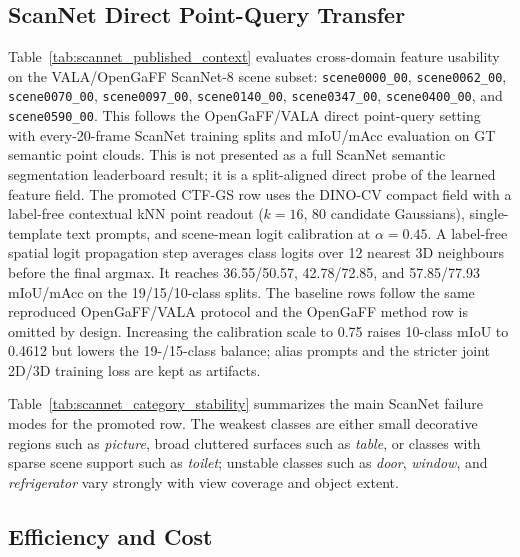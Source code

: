 \documentclass[10pt,twocolumn,letterpaper]{article}
\newcommand{\method}{CTF-GS}
\begin{document}
\subsection{ScanNet Direct Point-Query Transfer}



Table~\ref{tab:scannet_published_context} evaluates cross-domain feature
usability on the VALA/OpenGaFF ScanNet-8 scene subset:
\texttt{scene0000\_00}, \texttt{scene0062\_00}, \texttt{scene0070\_00},
\texttt{scene0097\_00}, \texttt{scene0140\_00}, \texttt{scene0347\_00},
\texttt{scene0400\_00}, and \texttt{scene0590\_00}. This follows the
OpenGaFF/VALA direct point-query setting with every-20-frame ScanNet training
splits and mIoU/mAcc evaluation on GT semantic point clouds. This is not
presented as a full ScanNet semantic segmentation leaderboard result; it is a
split-aligned direct probe of the learned feature field. The promoted
\method{} row uses the DINO-CV compact field with a label-free contextual kNN
point readout ($k=16$, 80 candidate Gaussians), single-template text prompts, and
scene-mean logit calibration at $\alpha=0.45$. A label-free spatial logit
propagation step averages class logits over 12 nearest 3D neighbours before the
final argmax. It reaches 36.55/50.57,
42.78/72.85, and 57.85/77.93 mIoU/mAcc on the 19/15/10-class splits. The
baseline rows follow the same reproduced OpenGaFF/VALA protocol and the
OpenGaFF method row is omitted by design. Increasing the calibration scale to 0.75
raises 10-class mIoU to 0.4612 but lowers the 19-/15-class balance; alias
prompts and the stricter joint 2D/3D training loss are kept as artifacts.



Table~\ref{tab:scannet_category_stability} summarizes the main ScanNet failure
modes for the promoted row. The weakest classes are either small decorative
regions such as \emph{picture}, broad cluttered surfaces such as \emph{table},
or classes with sparse scene support such as \emph{toilet}; unstable classes
such as \emph{door}, \emph{window}, and \emph{refrigerator} vary strongly with
view coverage and object extent.

\subsection{Efficiency and Cost}


\end{document}
